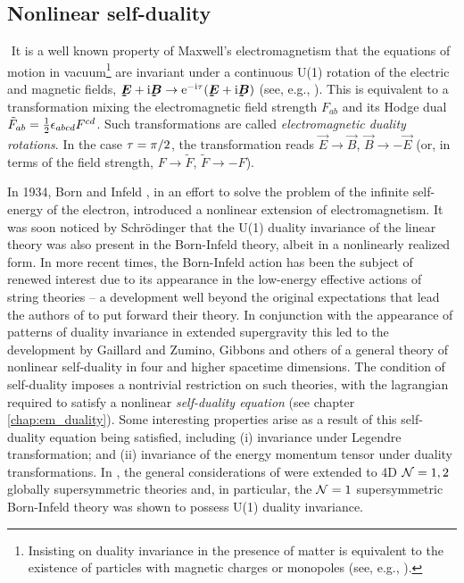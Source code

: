 \subsection*{Nonlinear self-duality}
${}$\newline
\indent It is a well known property of Maxwell's electromagnetism that the equations of motion in vacuum\footnote{Insisting on duality invariance in the presence of matter is equivalent to the existence of particles with magnetic charges or monopoles (see, e.g., \cite{Jackson:1999xw}).} are invariant under a continuous U(1) rotation of the electric and magnetic fields, $\vec{E}+{\rm i}\vec{B}\to{\rm e}^{-{\rm i}\t}(\vec{E}+{\rm i}\vec{B})$ (see, e.g., \cite{Jackson:1999xw,Olive:1995sw}). This is equivalent to a transformation mixing the electromagnetic field strength $F_{ab}$ and its Hodge dual ${\tilde F}_{ab}=\frac{1}{2}\epsilon_{abcd}F^{cd}$. Such transformations are called {\it electromagnetic duality rotations}. In the case $\tau=\pi/2$, the transformation reads $\vec{E}\to\vec{B}$, $\vec{B}\to-\vec{E}$ (or, in terms of the field strength, $F\to{\tilde F}$, ${\tilde F}\to-F$).

In 1934, Born and Infeld \cite{Born:1934gh}, in an effort to solve the problem of the infinite self-energy of the electron, introduced a nonlinear extension of electromagnetism. It was soon noticed by Schr{\"o}dinger \cite{Schrodinger:1935} that the U(1) duality invariance of the linear theory was also present in the Born-Infeld theory, albeit in a nonlinearly realized form. In more recent times, the Born-Infeld action has been the subject of renewed interest due to its appearance in the low-energy effective actions of string theories \cite{Fradkin:1985qd,Leigh:1989jq} -- a development well beyond the original expectations that lead the authors of \cite{Born:1934gh} to put forward their theory. In conjunction with the appearance of patterns of duality invariance in extended supergravity \cite{Ferrara:1976iq,Cremmer:1979up} this led to the development by Gaillard and Zumino, Gibbons and others \cite{Gaillard:1981rj,Zumino:1981pt,Gibbons:1995cv,Gibbons:1995ap,Gaillard:1997zr,Gaillard:1997rt,Tanii:1998px,Araki:1998nn,Kimura:1999jb,Brace:1999zi,Hatsuda:1999ys,Aschieri:1999jr,Aschieri:2000dx,Ivanov:2002ab,Ivanov:2003uj} of a general theory of nonlinear self-duality in four and higher spacetime dimensions. The condition of self-duality imposes a nontrivial restriction on such theories, with the lagrangian required to satisfy a nonlinear {\it self-duality equation} (see chapter \ref{chap:em_duality}). Some interesting properties arise as a result of this self-duality equation being satisfied, including (i) invariance under Legendre transformation; and (ii) invariance of the energy momentum tensor under duality transformations. In \cite{Kuzenko:2000tg,Kuzenko:2000uh}, the general considerations of \cite{Gaillard:1981rj,Zumino:1981pt,Gibbons:1995cv,Gibbons:1995ap,Gaillard:1997zr,Gaillard:1997rt,Tanii:1998px,Araki:1998nn,Kimura:1999jb,Brace:1999zi,Hatsuda:1999ys,Aschieri:1999jr,Aschieri:2000dx} were extended to 4D ${\cal N}=1,2$ globally supersymmetric theories and, in particular, the ${\cal N}=1$ supersymmetric Born-Infeld theory \cite{Cecotti:1986gb} was shown to possess U(1) duality invariance. 

